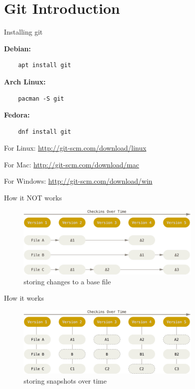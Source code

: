 \section{Git Introduction}

\begin{frame}[fragile]{Installing git}

    \textbf{Debian:}
    \begin{lstlisting}
    apt install git
    \end{lstlisting}

    \textbf{Arch Linux:}
    \begin{lstlisting}
    pacman -S git
    \end{lstlisting}

    \textbf{Fedora:}
    \begin{lstlisting}
    dnf install git
    \end{lstlisting}

    \begin{description}
        \item{For Linux:} \url{http://git-scm.com/download/linux}
        \item{For Mac:} \url{http://git-scm.com/download/mac}
        \item{For Windows:} \url{http://git-scm.com/download/win}
    \end{description}

\end{frame}

\begin{frame}[fragile]{How it NOT works}
    \begin{figure}
        \centering
        \includegraphics[width=0.8\textwidth]{img/filebased.png}
        \caption{storing changes to a base file}
    \end{figure}
\end{frame}

\begin{frame}[fragile]{How it works}
    \begin{figure}
        \centering
        \includegraphics[width=0.8\textwidth]{img/snapshotbased.png}
        \caption{storing snapshots over time}
    \end{figure}
\end{frame}

